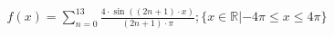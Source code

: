 \documentclass[preview]{standalone}
\begin{document}
\begin{align*}
f(x) = \sum_{n=0}^{13} \frac{4 \cdot \sin ((2n + 1) \cdot x) }{ (2n + 1) \cdot \pi}                 ; \{ x \in \mathbb{R} | -4 \pi \leqslant x \leqslant 4 \pi \}
\end{align*}
\end{document}
